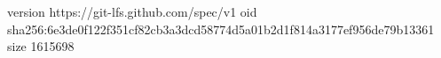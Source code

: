 version https://git-lfs.github.com/spec/v1
oid sha256:6e3de0f122f351cf82cb3a3dcd58774d5a01b2d1f814a3177ef956de79b13361
size 1615698
